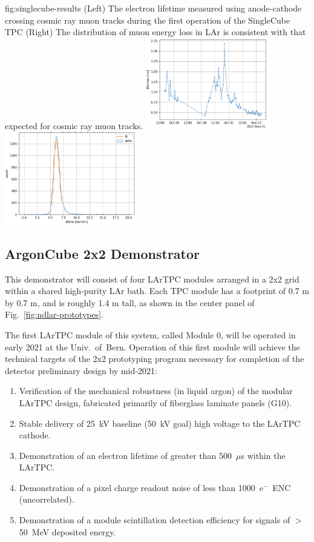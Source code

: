 \begin{dunefigure}{fig:singlecube-results}
{(Left) The electron lifetime measured using anode-cathode crossing cosmic ray muon tracks during the first operation of the SingleCube TPC (Right) The distribution of muon energy loss in LAr is consistent with that expected for cosmic ray muon tracks.}
\includegraphics[width=0.4\textwidth]{graphics/lartpc/Prototyping/singlecube_electron_lifetime.png}
\includegraphics[width=0.43\textwidth]{graphics/lartpc/Prototyping/singlecube_muon_eloss.png}
\end{dunefigure}


\subsection{ArgonCube 2x2 Demonstrator}
\label{sec:2x2Demo}

This demonstrator will consist of four LArTPC modules arranged in a 2x2 grid within a shared high-purity LAr bath.
Each TPC module has a footprint of 0.7 m by 0.7 m, and is roughly 1.4 m tall, as shown in the center panel of Fig.~\ref{fig:ndlar-prototypes}.

The first LArTPC module of this system, called Module 0, will be operated in early 2021 at the Univ.~of~Bern.  
Operation of this first module will achieve the technical targets of the 2x2 prototyping program necessary for completion of the detector preliminary design by mid-2021:
\begin{enumerate}
    \item Verification of the mechanical robustness (in liquid argon) of the modular LArTPC design, fabricated primarily of fiberglass laminate panels (G10).
    \item Stable delivery of 25~kV baseline (50~kV goal) high voltage to the LArTPC cathode.
    \item Demonstration of an electron lifetime of greater than 500~$\mu$s within the LArTPC.
    \item Demonstration of a pixel charge readout noise of less than 1000~e$^-$~ENC (uncorrelated).
    \item Demonstration of a module scintillation detection efficiency for signals of $>$50~MeV deposited energy.
\end{enumerate}

